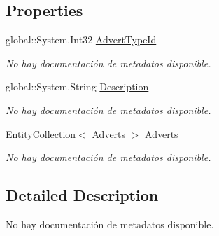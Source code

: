 \subsection*{Properties}
\begin{DoxyCompactItemize}
\item 
global\-::\-System.\-Int32 \hyperlink{class_microsoft_1_1_samples_1_1_kinect_1_1_basic_interactions_1_1_advert_types_a3ced9f92e6af22312a898c368f2a0b76}{Advert\-Type\-Id}
\begin{DoxyCompactList}\small\item\em No hay documentación de metadatos disponible. \end{DoxyCompactList}\item 
global\-::\-System.\-String \hyperlink{class_microsoft_1_1_samples_1_1_kinect_1_1_basic_interactions_1_1_advert_types_a04f70c7dc1230372c7ec3ff2e1c319b4}{Description}
\begin{DoxyCompactList}\small\item\em No hay documentación de metadatos disponible. \end{DoxyCompactList}\item 
Entity\-Collection$<$ \hyperlink{class_microsoft_1_1_samples_1_1_kinect_1_1_basic_interactions_1_1_adverts}{Adverts} $>$ \hyperlink{class_microsoft_1_1_samples_1_1_kinect_1_1_basic_interactions_1_1_advert_types_ac4ca5a1add71e98a6845ca9e2e7b06b6}{Adverts}
\begin{DoxyCompactList}\small\item\em No hay documentación de metadatos disponible. \end{DoxyCompactList}\end{DoxyCompactItemize}


\subsection{Detailed Description}
No hay documentación de metadatos disponible. 



